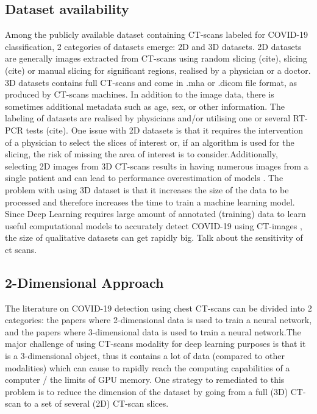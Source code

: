 \documentclass[12pt, letterpaper]{article}
\begin{document}
\subsection{Dataset availability}
Among the publicly available dataset containing CT-scans labeled for COVID-19 classification, 2 categories of datasets emerge: 2D and 3D datasets. 2D datasets are generally images extracted from CT-scans using random slicing (cite), slicing (cite) or manual slicing for significant regions, realised by a physician or a doctor. 3D datasets contains full CT-scans and come in .mha or .dicom file format, as produced by CT-scans machines. In addition to the image data, there is sometimes additional metadata such as age, sex, or other information. The labeling of datasets are realised by physicians and/or utilising one or several RT-PCR tests (cite). One issue with 2D datasets is that it requires the intervention of a physician to select the slices of interest or, if an algorithm is used for the slicing, the risk of missing the area of interest is to consider.Additionally, selecting 2D images from 3D CT-scans results in having numerous images from a single patient and can lead to performance overestimation of models \cite{Altaf_2021}. The problem with using 3D dataset is that it increases the size of the data to be processed and therefore increases the time to train a machine learning model. Since Deep Learning requires large amount of annotated (training) data to learn useful computational models to accurately detect COVID-19 using CT-images \cite{Altaf_2021}, the size of qualitative datasets can get rapidly big.
Talk about the sensitivity of ct scans.  



\subsection{2-Dimensional Approach}
The literature on COVID-19 detection using chest CT-scans can be divided into 2 categories: the papers where 2-dimensional data is used to train a neural network, and the papers where 3-dimensional data is used to train a neural network.The major challenge of using CT-scans modality for deep learning purposes is that it is a 3-dimensional object, thus it contains a lot of data (compared to other modalities) which can cause to rapidly reach the computing capabilities of a computer / the limits of GPU memory. One strategy to remediated to this problem is to reduce the dimension of the dataset by going from a full (3D) CT-scan to a set of several (2D) CT-scan slices.
\end{document}
